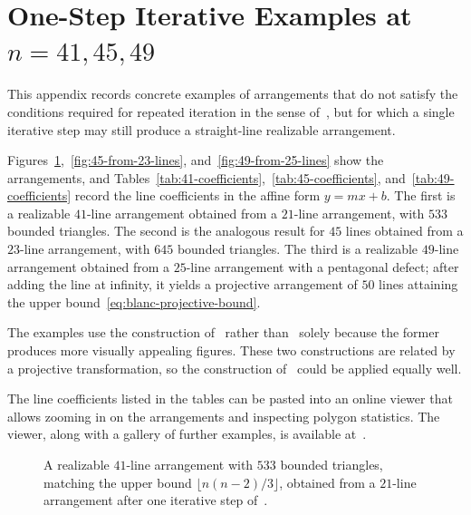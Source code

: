 \section{One-Step Iterative Examples at \texorpdfstring{$n=41,45,49$}{n=41,45,49}}\label{sec:appendix-one-step}

This appendix records concrete examples of arrangements that
do not satisfy the conditions required for repeated
iteration in the sense of~\cite{forge1998,bartholdi2007}, but for which a
single iterative step may still produce a straight-line realizable arrangement.

Figures~\ref{fig:41-from-21-lines},~\ref{fig:45-from-23-lines},
and~\ref{fig:49-from-25-lines} show the arrangements, and
Tables~\ref{tab:41-coefficients},~\ref{tab:45-coefficients},
and~\ref{tab:49-coefficients} record the line coefficients in the affine form
$y = mx + b$.
The first is a realizable $41$-line arrangement
obtained from a $21$-line arrangement,
with $533$ bounded triangles.
The second is the analogous result for $45$ lines
obtained from a $23$-line arrangement, with $645$ bounded triangles.
The third is a realizable $49$-line arrangement obtained from a $25$-line
arrangement with a pentagonal defect; after adding the line at infinity, it
yields a projective arrangement of $50$ lines attaining the upper
bound~\eqref{eq:blanc-projective-bound}.

The examples use the construction of~\cite{forge1998} rather
than~\cite{bartholdi2007} solely because the former produces more visually
appealing figures. These two constructions are related by a projective
transformation, so the construction of~\cite{bartholdi2007} could be applied
equally well.

The line coefficients listed in the tables can be pasted into an online
viewer that allows zooming in on the arrangements and inspecting polygon
statistics. The viewer, along with a gallery of further examples, is
available at~\cite{repo}.


\begin{figure}[!hp]
\centering

\caption{A realizable $41$-line arrangement with $533$ bounded triangles,
matching the upper bound $\lfloor n(n-2)/3 \rfloor$, obtained
from a $21$-line arrangement after one iterative step of~\cite{forge1998}.}
\label{fig:41-from-21-lines}
\end{figure}

